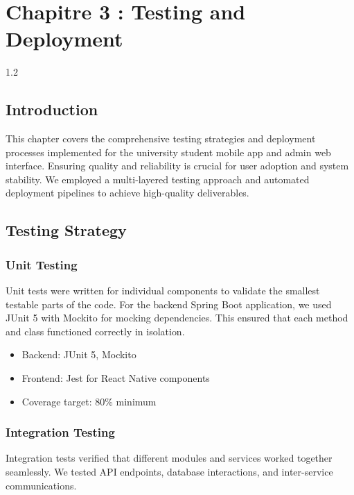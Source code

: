 \chapter{ Chapitre 3 : Testing and Deployment}
\begin{spacing}{1.2}
\minitoc
\thispagestyle{MyStyle}
\end{spacing}
\newpage
\begin{sloppypar} 

\section{Introduction}
\vspace{-4mm}
This chapter covers the comprehensive testing strategies and deployment processes implemented for the university student mobile app and admin web interface. Ensuring quality and reliability is crucial for user adoption and system stability. We employed a multi-layered testing approach and automated deployment pipelines to achieve high-quality deliverables.

\section{Testing Strategy}
\vspace{-4mm}
\subsection{Unit Testing}
Unit tests were written for individual components to validate the smallest testable parts of the code. For the backend Spring Boot application, we used JUnit 5 with Mockito for mocking dependencies. This ensured that each method and class functioned correctly in isolation.

\begin{itemize}
\item Backend: JUnit 5, Mockito
\item Frontend: Jest for React Native components
\item Coverage target: 80\% minimum
\end{itemize}

\subsection{Integration Testing}
Integration tests verified that different modules and services worked together seamlessly. We tested API endpoints, database interactions, and inter-service communications.


\end{sloppypar}
